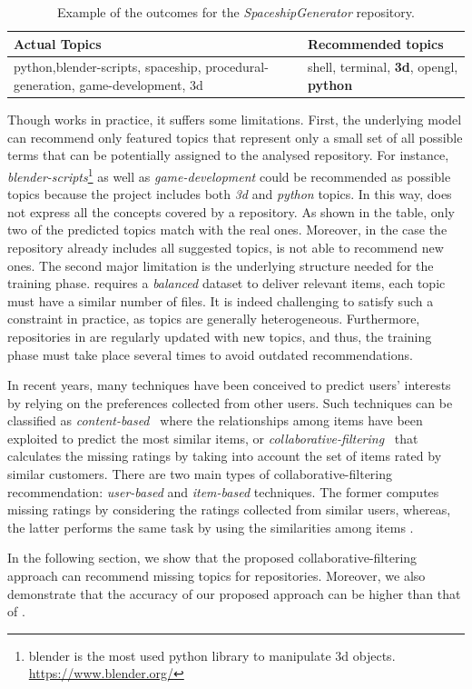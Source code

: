 \begin{table}[h]
\centering
\resizebox{8.5cm}{!} {
\footnotesize
\begin{tabular}{| p{3.2cm} | p{3.2cm} | }
\hline
 \textbf{Actual Topics} &\textbf{ Recommended topics} \\ \hline
     python,blender-scripts, spaceship, procedural-generation, 
     game-development, 3d        &  
  shell, terminal, \textbf{3d},    opengl,    \textbf{python}        \\ \hline

\end{tabular}
}
\caption{Example of the \MNB outcomes for the \emph{SpaceshipGenerator} repository.}
\label{tab:example}
\end{table} 


Though \MNB works in practice, it suffers some limitations. First, the 
underlying model can recommend only featured topics that represent only a small 
set of all possible terms that can be potentially assigned to the analysed 
repository.
%
For instance, \emph{blender-scripts}\footnote{blender is the most used python 
library to manipulate 3d objects. \url{https://www.blender.org/}} as well as 
\emph{game-development} could be recommended as possible topics because the 
project includes both \emph{3d} and \emph{python} topics.
In this way, \MNB does not express all the concepts covered by a \GH 
repository. As shown in the table, only two of the predicted topics match 
with the real ones. Moreover, in the case the repository already includes all 
suggested topics, \MNB is not able to recommend new ones.
The second major limitation is the underlying structure needed for the training 
phase. \MNB requires a \emph{balanced} dataset to deliver relevant items, 
\ie each topic must have a similar number of \RM files. It is indeed challenging to satisfy such a constraint in practice, as topics are generally heterogeneous. 
Furthermore, repositories in \GH are regularly updated with new topics, and 
thus, the training phase must take place several times to avoid outdated 
recommendations. 

In recent years, many techniques have been conceived to predict users' interests 
by relying on the preferences collected from other users. Such techniques can 
be classified as  \emph{content-based}~\cite{Pazzani2007} where the 
relationships among items have been exploited to predict the most similar items,
or \emph{collaborative-filtering}~\cite{Miranda:2008:ICF:1486927.1487083} that 
calculates the missing ratings by taking into account the set of items rated by 
similar customers. There are two main types of collaborative-filtering 
recommendation: \emph{user-based} \cite{Zhao:2010:UCR:1748610.1749278} and 
\emph{item-based} \cite{Sarwar:2001:ICF:371920.372071} techniques. The former 
computes missing ratings by considering the ratings collected from similar 
users, whereas, the latter performs the same task by using the similarities 
among items \cite{Cremonesi:2008:EMC:1468165.1468327}.

In the following section, we show that the proposed collaborative-filtering approach can recommend missing topics for \GH repositories. Moreover, we also demonstrate that the accuracy of 
our proposed approach can be higher than that of \MNB.
